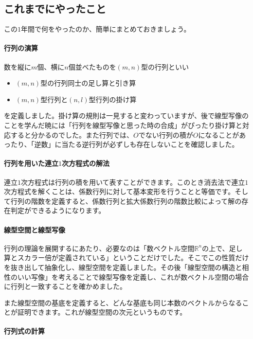 \subsection{これまでにやったこと}

この$1$年間で何をやったのか、簡単にまとめておきましょう。

\paragraph{行列の演算}

数を縦に$m$個、横に$n$個並べたものを$(m, n)$型の行列といい
\begin{itemize}
\item $(m, n)$型の行列同士の足し算と引き算
\item $(m, n)$型行列と$(n, l)$型行列の掛け算
\end{itemize}
を定義しました。掛け算の規則は一見すると変わっていますが、後で線型写像のことを学んだ暁には「行列を線型写像と思った時の合成」がぴったり掛け算と対応すると分かるのでした。また行列では、$O$でない行列の積が$O$になることがあったり、「逆数」に当たる逆行列が必ずしも存在しないことを確認しました。

\paragraph{行列を用いた連立$1$次方程式の解法}

連立$1$次方程式は行列の積を用いて表すことができます。このとき消去法で連立$1$次方程式を解くことは、係数行列に対して基本変形を行うことと等価です。そして行列の階数を定義すると、係数行列と拡大係数行列の階数比較によって解の存在判定ができるようになります。

\paragraph{線型空間と線型写像}

行列の理論を展開するにあたり、必要なのは「数ベクトル空間$\mathbb{R}^n$の上で、足し算とスカラー倍が定義されている」ということだけでした。そこでこの性質だけを抜き出して抽象化し、線型空間を定義しました。その後「線型空間の構造と相性のいい写像」を考えることで線型写像を定義し、これが数ベクトル空間の場合に行列と一致することを確かめました。

また線型空間の基底を定義すると、どんな基底も同じ本数のベクトルからなることが証明できます。これが線型空間の次元というものです。

\paragraph{行列式の計算}

